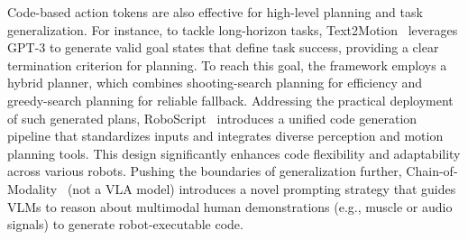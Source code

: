 \documentclass[10pt, a4paper, logo, copyright]{googledeepmind} %
\begin{document}
Code-based action tokens are also effective for high-level planning and task generalization. For instance, to tackle long-horizon tasks, Text2Motion~\cite{Lin_2023} leverages GPT-3 to generate valid goal states that define task success, providing a clear termination criterion for planning. To reach this goal, the framework employs a hybrid planner, which combines shooting-search planning for efficiency and greedy-search planning for reliable fallback. Addressing the practical deployment of such generated plans, RoboScript~\cite{Chen2024RoboScriptCG} introduces a unified code generation pipeline that standardizes inputs and integrates diverse perception and motion planning tools. This design significantly enhances code flexibility and adaptability across various robots. Pushing the boundaries of generalization further, Chain-of-Modality~\cite{Wang2025ChainofModalityLM} (not a VLA model) introduces a novel prompting strategy that guides VLMs to reason about multimodal human demonstrations (e.g., muscle or audio signals) to generate robot-executable code.

\end{document}
